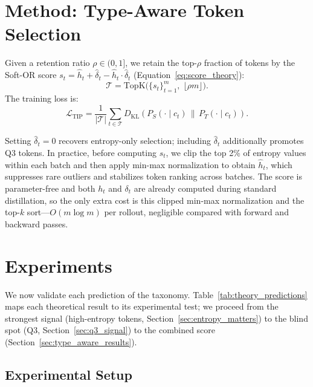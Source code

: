 \documentclass{article}
\newcommand{\KL}{\mathrm{KL}}
\begin{document}
\section{Method: Type-Aware Token Selection}
\label{sec:method}

Given a retention ratio $\rho \in (0,1]$, we retain the top-$\rho$ fraction of tokens by the Soft-OR score $s_t = \hat{h}_t + \hat{\delta}_t - \hat{h}_t \cdot \hat{\delta}_t$ (Equation~\ref{eq:score_theory}):
\begin{equation}
    \mathcal{T} = \mathrm{TopK}\bigl(\{s_t\}_{t=1}^{m},\; \lfloor \rho m \rfloor\bigr).
\end{equation}
The training loss is:
\begin{equation}
    \mathcal{L}_{\mathrm{TIP}} = \frac{1}{|\mathcal{T}|} \sum_{t \in \mathcal{T}} D_{\KL}\!\left(P_S(\cdot \mid c_t) \,\|\, P_T(\cdot \mid c_t)\right).
    \label{eq:tip_loss}
\end{equation}

Setting $\hat{\delta}_t = 0$ recovers entropy-only selection; including $\hat{\delta}_t$ additionally promotes Q3 tokens.
In practice, before computing $s_t$, we clip the top 2\% of entropy values within each batch and then apply min-max normalization to obtain $\hat{h}_t$, which suppresses rare outliers and stabilizes token ranking across batches.
The score is parameter-free and both $h_t$ and $\delta_t$ are already computed during standard distillation, so the only extra cost is this clipped min-max normalization and the top-$k$ sort---$O(m \log m)$ per rollout, negligible compared with forward and backward passes.

\section{Experiments}
\label{sec:experiments}

We now validate each prediction of the taxonomy.
Table~\ref{tab:theory_predictions} maps each theoretical result to its experimental test; we proceed from the strongest signal (high-entropy tokens, Section~\ref{sec:entropy_matters}) to the blind spot (Q3, Section~\ref{sec:q3_signal}) to the combined score (Section~\ref{sec:type_aware_results}).

\subsection{Experimental Setup}
\label{sec:exp_setup}
\end{document}
